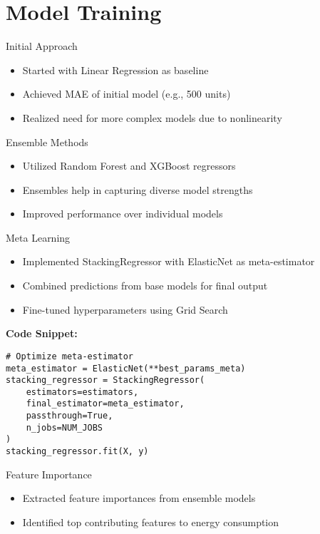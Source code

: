 \documentclass{beamer}
\begin{document}
\section{Model Training}

\begin{frame}{Initial Approach}
  \begin{itemize}
    \item Started with Linear Regression as baseline
    \item Achieved MAE of initial model (e.g., 500 units)
    \item Realized need for more complex models due to nonlinearity
  \end{itemize}
\end{frame}

\begin{frame}{Ensemble Methods}
  \begin{itemize}
    \item Utilized Random Forest and XGBoost regressors
    \item Ensembles help in capturing diverse model strengths
    \item Improved performance over individual models
  \end{itemize}
  
\end{frame}

\begin{frame}[fragile]{Meta Learning}
  \begin{itemize}
    \item Implemented StackingRegressor with ElasticNet as meta-estimator
    \item Combined predictions from base models for final output
    \item Fine-tuned hyperparameters using Grid Search
  \end{itemize}
  \vspace{5pt}
  \textbf{Code Snippet:}
  \begin{lstlisting}
# Optimize meta-estimator
meta_estimator = ElasticNet(**best_params_meta)
stacking_regressor = StackingRegressor(
    estimators=estimators,
    final_estimator=meta_estimator,
    passthrough=True,
    n_jobs=NUM_JOBS
)
stacking_regressor.fit(X, y)
  \end{lstlisting}
\end{frame}

\begin{frame}{Feature Importance}
  \begin{itemize}
    \item Extracted feature importances from ensemble models
    \item Identified top contributing features to energy consumption
  \end{itemize}
\end{frame}
\end{document}
